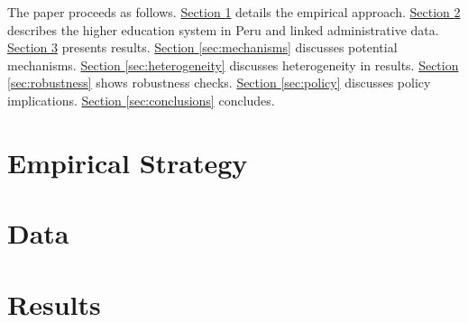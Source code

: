 










The paper proceeds as follows. \hyperref[sec:empirical_strategy]{Section \ref{sec:empirical_strategy}} details the empirical approach. \hyperref[sec:data]{Section \ref{sec:data}}  describes the higher education system in Peru and linked administrative data. \hyperref[sec:results]{Section \ref{sec:results}} presents results. \hyperref[sec:mechanisms]{Section \ref{sec:mechanisms}} discusses potential mechanisms. \hyperref[sec:heterogeneity]{Section \ref{sec:heterogeneity}} discusses heterogeneity in results. \hyperref[sec:robustness]{Section \ref{sec:robustness}} shows robustness checks. \hyperref[sec:policy]{Section \ref{sec:policy}} discusses policy implications. \hyperref[sec:conclusions]{Section \ref{sec:conclusions}} concludes.





\section{Empirical Strategy}\label{sec:empirical_strategy}


\section{Data}\label{sec:data}

\section{Results}\label{sec:results}

